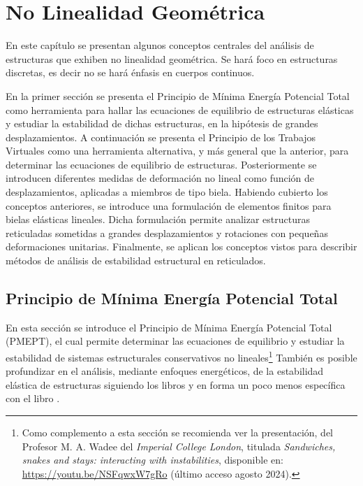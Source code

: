 \chapter{No Linealidad Geométrica}\label{cap2GNA}

En este capítulo se presentan algunos conceptos centrales del análisis de estructuras que exhiben no linealidad geométrica. Se hará foco en estructuras discretas, es decir no se hará énfasis en cuerpos continuos.

En la primer sección se presenta el Principio de Mínima Energía Potencial Total como herramienta para hallar las ecuaciones de equilibrio de estructuras elásticas y estudiar la estabilidad de dichas estructuras, en la hipótesis de grandes desplazamientos. %
%
A continuación se presenta el Principio de los Trabajos Virtuales como una herramienta alternativa, y más general que la anterior, para determinar las ecuaciones de equilibrio de estructuras. %
% 
Posteriormente se introducen diferentes medidas de deformación no lineal como función de desplazamientos, aplicadas a miembros de tipo biela. %
%
Habiendo cubierto los conceptos anteriores, se introduce una formulación de elementos finitos para bielas elásticas lineales. %
%
Dicha formulación permite analizar estructuras reticuladas sometidas a grandes desplazamientos y rotaciones con pequeñas deformaciones unitarias. %
%
Finalmente, se aplican los conceptos vistos para describir métodos de análisis de estabilidad estructural en reticulados.




\section{Principio de Mínima Energía Potencial Total}

En esta sección se introduce el Principio de Mínima Energía Potencial Total (PMEPT), el cual permite determinar las ecuaciones de equilibrio y estudiar la estabilidad de sistemas estructurales conservativos no lineales\footnote{Como complemento a esta sección se recomienda ver la presentación, del Profesor M. A. Wadee del \textit{Imperial College London}, titulada \textit{Sandwiches, snakes and stays: interacting with instabilities}, disponible en: \href{https://youtu.be/NSFqwxW7gRo}{https://youtu.be/NSFqwxW7gRo} (último acceso agosto 2024).}
%
También es posible profundizar en el análisis, mediante enfoques energéticos, de la estabilidad elástica de estructuras siguiendo los libros \citep{thompson1973general,Crisfield1997} y en forma un poco menos específica con el libro \citep{timoshenko2012theory}.

